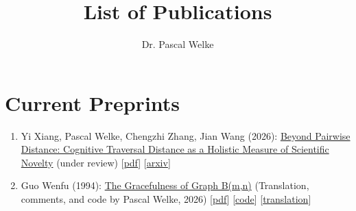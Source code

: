 \documentclass{scrartcl}
\author{Dr. Pascal Welke}
\title{List of Publications}
\begin{document}
\setcounter{saveenumi}{0}
\newcommand{\seti}{\setcounter{saveenumi}{\value{enumi}}}
\newcommand{\conti}{\setcounter{enumi}{\value{saveenumi}}}


\section{Current Preprints}
\begin{enumerate}
\conti
\item
\label{xiang2026novelty}
Yi Xiang, Pascal Welke, Chengzhi Zhang, Jian Wang (2026):\newline
\href{https://pwelke.de/publications/xiang2026novelty.pdf}{Beyond Pairwise Distance: Cognitive Traversal Distance as a
Holistic Measure of Scientific Novelty}\newline
(under review)\newline
{\footnotesize
[\href{https://pwelke.de/publications/xiang2026novelty.pdf}{pdf}]
[\href{https://arxiv.org/abs/2602.06607}{arxiv}]
}
\item
\label{guo}
Guo Wenfu (1994):\newline
\href{https://pwelke.de/ramblings/guo2026graceful-translation.pdf}{The Gracefulness of Graph B(m,n)}\newline
(Translation, comments, and code by Pascal Welke, 2026)\newline
{\footnotesize
[\href{https://pwelke.de/ramblings/guo2026graceful-translation.pdf}{pdf}]
[\href{https://github.com/pwelke/graceful_tadpoles}{code}]
[\href{https://pwelke.de/}{translation}]
}
\seti
\end{enumerate}
\end{document}
